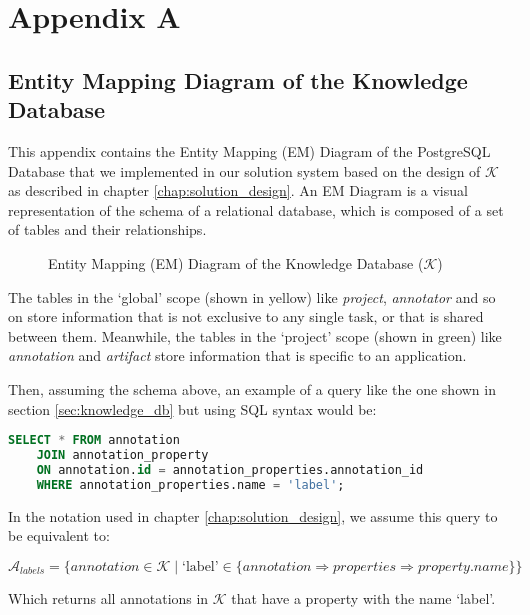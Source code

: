 \documentclass[../main.tex]{subfiles}
\begin{document}
\chapter*{Appendix A} \label{appendix:db_er_diagram}

\section*{Entity Mapping Diagram of the Knowledge Database} 

This appendix contains the Entity Mapping (EM) Diagram of the PostgreSQL Database that we implemented in our solution system based on the design of $\mathcal{K}$ as described in chapter \ref{chap:solution_design}.  An EM Diagram is a visual representation of the schema of a relational database, which is composed of a set of tables and their relationships.

\begin{figure}[h] 
    \centering
    \caption{Entity Mapping (EM) Diagram of the Knowledge Database ($\mathcal{K}$)}
\end{figure}

The tables in the `global' scope (shown in yellow) like \textit{project}, \textit{annotator} and so on store information that is not exclusive to any single task, or that is shared between them. Meanwhile, the tables in the `project' scope (shown in green) like \textit{annotation} and \textit{artifact} store information that is specific to an application. 

Then, assuming the schema above, an example of a query like the one shown in section \ref{sec:knowledge_db} but using SQL syntax  would be:


\begin{lstlisting}[language=SQL]
    SELECT * FROM annotation
    JOIN annotation_property
    ON annotation.id = annotation_properties.annotation_id
    WHERE annotation_properties.name = 'label';
\end{lstlisting}

In the notation used in chapter \ref{chap:solution_design}, we assume this query to be equivalent to:

\[\mathcal{A}_{labels} = \{annotation \in \mathcal{K} \mid \text{`label'} \in \{annotation \Rightarrow properties \Rightarrow property.name\}\}\]

Which returns all annotations in $\mathcal{K}$ that have a property with the name `label'.
\end{document}
